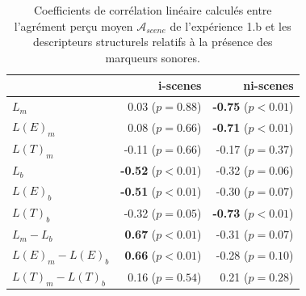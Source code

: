 \documentclass[twoside,twocolumn]{article}
\begin{document}
\begin{table}[t]
\setlength{\tabcolsep}{3pt}
\centering
{\renewcommand{\arraystretch}{1}
\centering
\begin{tabular}{l r r}
                  &   i-scenes                  & ni-scenes \\
\hline
$L_m$              & 0.03  ($p=0.88$)           & \textbf{-0.75} ($p<0.01$) \\
$L(E)_m$           & 0.08  ($p=0.66$)           & \textbf{-0.71} ($p<0.01$) \\
$L(T)_m$           & -0.11 ($p=0.66$)           & -0.17 ($p=0.37$) \\
$L_b$              & \textbf{-0.52} ($p<0.01$)  & -0.32 ($p=0.06$) \\
$L(E)_b$           & \textbf{-0.51} ($p<0.01$)  & -0.30 ($p=0.07$) \\
$L(T)_b$           & -0.32 ($p=0.05$)           & \textbf{-0.73} ($p<0.01$) \\
$L_m-L_b$          & \textbf{0.67} ($p<0.01$)   & -0.31 ($p=0.07$) \\
$L(E)_m-L(E)_b$    & \textbf{0.66} ($p<0.01$)   & -0.28 ($p=0.10$) \\
$L(T)_m-L(T)_b$    & 0.16 ($p=0.54$)            & 0.21 ($p=0.28$) \\
\hline
\end{tabular}
}
\vspace{0.5mm}
\caption{Coefficients de corrélation linéaire calculés entre l'agrément perçu moyen $\mathcal{A}_{scene}$ de l'expérience 1.b et les descripteurs structurels relatifs à la présence des marqueurs sonores.}
\label{tab:corrMarkers}
\end{table}
\end{document}
